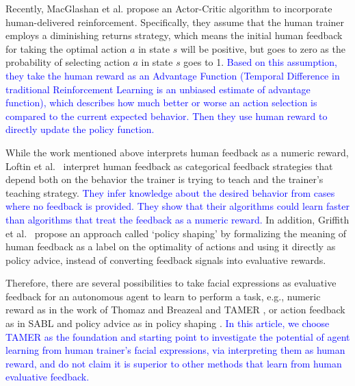 Recently, MacGlashan et al. \cite{macglashanconvergent} propose an Actor-Critic algorithm to incorporate human-delivered reinforcement. Specifically, they assume that the human trainer employs a diminishing returns strategy, which means the initial human feedback for taking the optimal action $a$ in state $s$ will be positive, but goes to zero as the probability of selecting action $a$ in state $s$ goes to 1. \textcolor{blue}{Based on this assumption, they take the human reward as an Advantage Function (Temporal Difference in traditional Reinforcement Learning is an unbiased estimate of advantage function), which describes how much better or worse an action selection is compared to the current expected behavior. Then they use human reward to directly %
update the policy function.}

While the work mentioned above interprets human feedback as a numeric reward, Loftin et al.\ \cite{loftin2015learning} interpret human feedback as categorical feedback strategies that depend both on the behavior the trainer is trying to teach and the trainer's teaching strategy. \textcolor{blue}{They infer knowledge about the desired behavior from cases where no feedback is provided. They show that their algorithms could learn faster than algorithms that treat the feedback as a numeric reward.} In addition, Griffith et al.\ \cite{griffith2013policy} propose an approach called `policy shaping' by formalizing the meaning of human feedback as a label on the optimality of actions and using it directly as policy advice, instead of converting feedback signals into evaluative rewards. 

Therefore, there are several possibilities to take facial expressions as evaluative feedback for an autonomous agent to learn to perform a task, e.g., numeric reward as in the work of Thomaz and Breazeal \cite{thomaz2008teachable} and TAMER \cite{knox2009interactively}, or action feedback as in SABL \cite{loftin2015learning} and policy advice as in policy shaping \cite{griffith2013policy}. %
\textcolor{blue}{In this article, we choose TAMER as the foundation and starting point to investigate the potential of agent learning from human trainer's facial expressions, via interpreting them as human reward, and do not claim it is superior to other methods that learn from human evaluative feedback.} 



